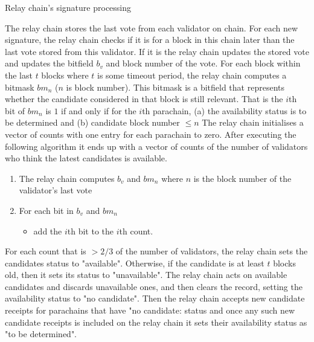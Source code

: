 \begin{algorithm}
  \caption[]{Relay chain's signature processing}
  \label{algo-singnature-processing}
  \begin{algorithmic}[1]
\State The relay chain stores the last vote from each validator on chain. For each new signature, the relay chain checks if it is for a block in this chain later than the last vote stored from this validator. If it is the relay chain updates the stored vote and updates the bitfield $b_v$ and block number of the vote.
\State For each block within the last $t$ blocks where $t$ is some timeout period, the relay chain computes a bitmask $bm_n$ ($n$ is block number). This bitmask is a bitfield that represents whether the candidate considered in that block is still relevant. That is the $i$th bit of $bm_n$ is $1$ if and only if for the $i$th parachain,
    (a) the availability status is to be determined and
    (b) candidate block number $\leq n$
\State The relay chain initialises a vector of counts with one entry for each parachain to zero. After executing the following algorithm it ends up with a vector of counts  of the number of validators who think the latest candidates is available.
	\begin{enumerate}
    \item The relay chain computes
    $b_v$ and $bm_n$
    where $n$ is the block number of the validator's last vote
   \item For each bit in $b_v$ and $bm_n$
		\begin{itemize}
        \item add the $i$th bit to the $i$th count.
        \end{itemize}
	\end{enumerate}
\State For each count that is $>2/3$ of the number of validators, the relay chain sets the candidates status to "available". Otherwise, if the candidate is at least $t$ blocks old, then it sets its status to "unavailable".
\State The relay chain acts on available candidates and discards unavailable ones, and then clears the record, setting the availability status to "no candidate". Then the relay chain accepts new candidate receipts for parachains that have "no candidate: status and once any such new candidate receipts is included on the relay chain it sets their availability status as "to be determined".
\end{algorithmic}
\end{algorithm}

